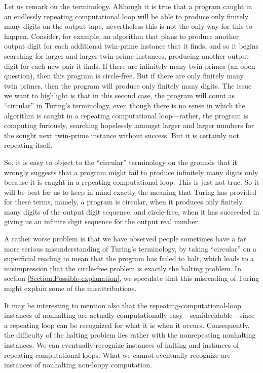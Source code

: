 \documentclass[12pt]{amsart}
\begin{document}
Let us remark on the terminology. Although it is true that a program caught in an endlessly repeating computational loop will be able to produce only finitely many digits on the output tape, nevertheless this is not the only way for this to happen.  Consider, for example, an algorithm that plans to produce another output digit for each additional twin-prime instance that it finds, and so it begins searching for larger and larger twin-prime instances, producing another output digit for each new pair it finds. If there are infinitely many twin primes (an open question), then this program is circle-free. But if there are only finitely many twin primes, then the program will produce only finitely many digits. The issue we want to highlight is that in this second case, the program will count as ``circular'' in Turing's terminology, even though there is no sense in which the algorithm is caught in a repeating computational loop---rather, the program is computing furiously, searching hopelessly amongst larger and larger numbers for the sought next twin-prime instance without success. But it is certainly not repeating itself.

So, it is easy to object to the ``circular'' terminology on the grounds that it wrongly suggests that a program might fail to produce infinitely many digits only because it is caught in a repeating computational loop. This is just not true. So it will be best for us to keep in mind exactly the meaning that Turing has provided for these terms, namely, a program is circular, when it produces only finitely many digits of the output digit sequence, and circle-free, when it has succeeded in giving us an infinite digit sequence for the output real number. 

A rather worse problem is that we have observed people sometimes have a far more serious misunderstanding of Turing's terminology, by taking ``circular'' on a superficial reading to mean that the program has failed to halt, which leads to a misimpression that the circle-free problem is exactly the halting problem. In section \ref{Section.Possible-explanation}, we speculate that this misreading of Turing might explain some of the misattributions.

It may be interesting to mention also that the repeating-computational-loop instances of nonhalting are actually computationally easy---semidecidable---since a repeating loop can be recognized for what it is when it occurs. Consequently, the difficulty of the halting problem lies rather with the nonrepeating nonhalting instances. We can eventually recognize instances of halting and instances of repeating computational loops. What we cannot eventually recognize are instances of nonhalting non-loopy computation. 
\end{document}
